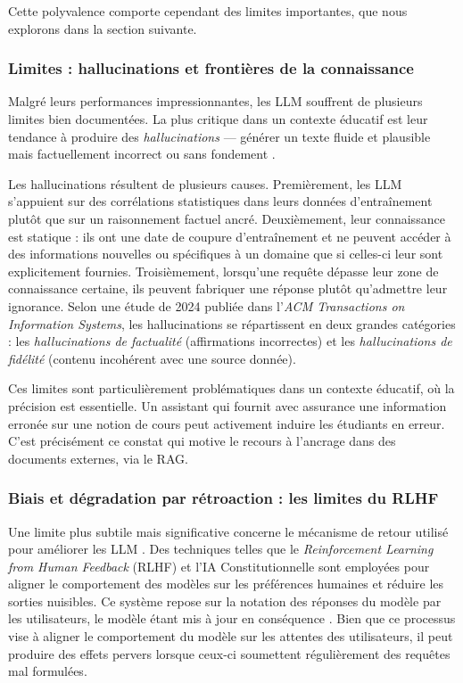 \documentclass[a4paper,11pt]{article}
\begin{document}
Cette polyvalence comporte cependant des limites importantes, que nous
explorons dans la section suivante.

\subsubsection{Limites : hallucinations et frontières de la connaissance}

Malgré leurs performances impressionnantes, les LLM souffrent de plusieurs
limites bien documentées. La plus critique dans un contexte éducatif est
leur tendance à produire des \emph{hallucinations} --- générer un texte
fluide et plausible mais factuellement incorrect ou sans fondement
\cite{zhang2023hallucination, huang2025hallucination, llm_hallucinations_medium}.

Les hallucinations résultent de plusieurs causes. Premièrement, les LLM
s'appuient sur des corrélations statistiques dans leurs données d'entraînement
plutôt que sur un raisonnement factuel ancré. Deuxièmement, leur connaissance
est statique : ils ont une date de coupure d'entraînement et ne peuvent
accéder à des informations nouvelles ou spécifiques à un domaine que si
celles-ci leur sont explicitement fournies. Troisièmement, lorsqu'une requête
dépasse leur zone de connaissance certaine, ils peuvent fabriquer une réponse
plutôt qu'admettre leur ignorance. Selon une étude de 2024 publiée dans
l'\emph{ACM Transactions on Information Systems}, les hallucinations se
répartissent en deux grandes catégories : les \emph{hallucinations de
factualité} (affirmations incorrectes) et les \emph{hallucinations de
fidélité} (contenu incohérent avec une source donnée).

Ces limites sont particulièrement problématiques dans un contexte éducatif,
où la précision est essentielle. Un assistant qui fournit avec assurance
une information erronée sur une notion de cours peut activement induire
les étudiants en erreur. C'est précisément ce constat qui motive le recours
à l'ancrage dans des documents externes, via le RAG.

\subsubsection{Biais et dégradation par rétroaction : les limites du RLHF}

Une limite plus subtile mais significative concerne le mécanisme de retour
utilisé pour améliorer les LLM \cite{rlhf_challenges_medium}. Des techniques
telles que le \emph{Reinforcement Learning from Human Feedback} (RLHF) et
l'IA Constitutionnelle sont employées pour aligner le comportement des modèles
sur les préférences humaines et réduire les sorties nuisibles. Ce système
repose sur la notation des réponses du modèle par les utilisateurs, le modèle
étant mis à jour en conséquence \cite{ouyang2022rlhf}. Bien que ce processus
vise à aligner le comportement du modèle sur les attentes des utilisateurs,
il peut produire des effets pervers lorsque ceux-ci soumettent régulièrement
des requêtes mal formulées.
\end{document}
